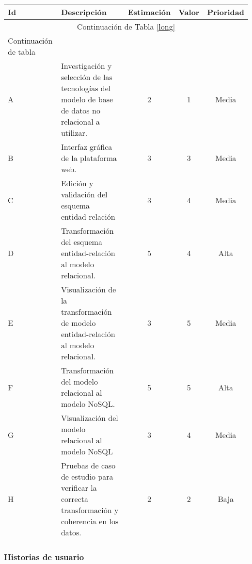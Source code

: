 \begin{longtable}{ p{.7cm} | p{8cm} | c | c | c }	
	
	\hline
	
	\textbf{Id} & \textbf{Descripción } & \textbf{Estimación } & \textbf{Valor }  & \textbf{Prioridad }\\
	\hline
	\hline
	
	\endfirsthead
	
	\multicolumn{5}{c}{Continuación de Tabla \ref{long}}\\
	\hline
	Continuación de tabla\\
	\hline
	\endhead
	
	\hline
	\endfoot
	
	A & Investigación y selección de las tecnologías del modelo de base de datos no relacional a utilizar. & 2 & 1 & Media \\[.4cm]
	B & Interfaz gráfica de la plataforma web. & 3 & 3 & Media\\[.4cm]
	C & Edición y validación del esquema entidad-relación & 3 & 4 & Media \\[.4cm]
	D & Transformación del esquema entidad-relación al modelo relacional. & 5 & 4 & Alta \\[.4cm]
	E & Visualización de la transformación de modelo entidad-relación al modelo relacional. & 3 & 5 & Media \\[.4cm]
	F & Transformación del modelo relacional al modelo NoSQL. & 5 & 5 & Alta \\[.4cm]
	G & Visualización del modelo relacional al modelo NoSQL & 3 & 4 & Media \\[.4cm]
	H & Pruebas de caso de estudio para verificar la correcta transformación y coherencia en los datos. & 2 & 2 & Baja \\[.4cm]
	
\end{longtable}

\subsubsection{Historias de usuario}

